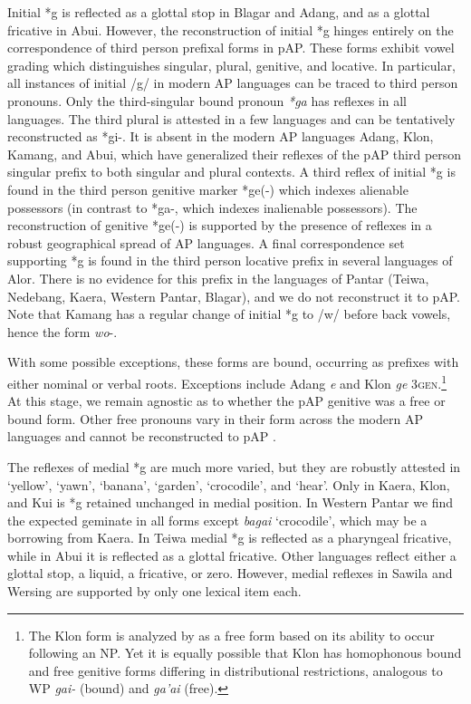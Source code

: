 Initial *g is reflected as a glottal stop in Blagar and Adang, and as a glottal fricative in Abui. However, the reconstruction of initial *g hinges entirely on the correspondence of third person prefixal forms in pAP. These forms exhibit vowel grading which distinguishes singular, plural, genitive, and locative. In particular, all instances of initial /g/ in modern AP languages can be traced to third person pronouns. Only the third-singular bound pronoun \textit{*ga }has reflexes in all languages. The third plural is attested in a few languages and can be tentatively reconstructed as *gi-. It is absent in the modern AP languages Adang, Klon, Kamang, and Abui, which have generalized their reflexes of the pAP third person singular prefix to both singular and plural contexts. A third reflex of initial *g is found in the third person genitive marker *ge(-) which indexes alienable possessors (in contrast to *ga-, which indexes inalienable possessors). The reconstruction of genitive *ge(-) is supported by the 
presence of reflexes in a robust geographical spread of AP languages. A final correspondence set supporting *g is found in the third person locative prefix in several languages of Alor. There is no evidence for this prefix in the languages of Pantar (Teiwa, Nedebang, Kaera, Western Pantar, Blagar), and we do not reconstruct it to pAP. Note that Kamang has a regular change of initial *g to /w/ before back vowels, hence the form \textit{wo}{}-.

With some possible exceptions, these forms are bound, occurring as prefixes with either nominal or verbal roots. Exceptions include Adang \textit{{\textglotstop}}\textit{e} and Klon \textit{ge} 3\textsc{gen.}\footnote{ The Klon form is analyzed by \citet{Baird2008} as a free form based on its ability to occur following an NP. Yet it is equally possible that Klon has homophonous bound and free genitive forms differing in distributional restrictions, analogous to WP \textit{gai-} (bound) and \textit{ga'ai} (free).} At this stage, we remain agnostic as to whether the pAP genitive was a free or bound form. Other free pronouns vary in their form across the modern AP languages and cannot be reconstructed to pAP \citep{KratochvilEtAl2011}. 

The reflexes of medial *g are much more varied, but they are robustly attested in `yellow', `yawn', `banana', `garden', `crocodile', and `hear'. Only in Kaera, Klon, and Kui is *g retained unchanged in medial position. In Western Pantar we find the expected geminate in all forms except \textit{bagai} `crocodile', which may be a borrowing from Kaera. In Teiwa medial *g is reflected as a pharyngeal fricative, while in Abui it is reflected as a glottal fricative. Other languages reflect either a glottal stop, a liquid, a fricative, or zero. However, medial reflexes in Sawila and Wersing are supported by only one lexical item each. 

